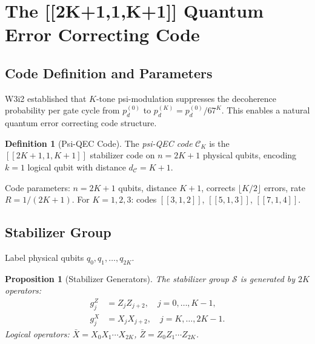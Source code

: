 \documentclass[11pt]{article}
\newtheorem{proposition}[theorem]{Proposition}
\theoremstyle{definition}
\newtheorem{definition}[theorem]{Definition}
\theoremstyle{remark}
\begin{document}
\section{The [[2K+1,1,K+1]] Quantum Error Correcting Code}
\label{sec:qec-code}

\subsection{Code Definition and Parameters}

W3i2 established that $K$-tone psi-modulation suppresses the decoherence
probability per gate cycle from $p_d^{(0)}$ to $p_d^{(K)} = p_d^{(0)}/67^K$.
This enables a natural quantum error correcting code structure.

\begin{definition}[Psi-QEC Code]
The \emph{psi-QEC code} $\mathcal{C}_{K}$ is the $[[2K+1,1,K+1]]$ stabilizer
code on $n = 2K+1$ physical qubits, encoding $k=1$ logical qubit with
distance $d_{\mathcal{C}} = K+1$.
\end{definition}

Code parameters: $n = 2K+1$ qubits, distance $K+1$, corrects
$\lfloor K/2\rfloor$ errors, rate $R = 1/(2K+1)$.
For $K=1,2,3$: codes $[[3,1,2]]$, $[[5,1,3]]$, $[[7,1,4]]$.

\subsection{Stabilizer Group}

Label physical qubits $q_0, q_1, \ldots, q_{2K}$.

\begin{proposition}[Stabilizer Generators]
The stabilizer group $\mathcal{S}$ is generated by $2K$ operators:
\begin{align}
  g_j^Z &= Z_j Z_{j+2}, \quad j = 0, \ldots, K-1, \label{eq:Zstab}\\
  g_j^X &= X_j X_{j+2}, \quad j = K, \ldots, 2K-1. \label{eq:Xstab}
\end{align}
Logical operators: $\bar{X} = X_0 X_1\cdots X_{2K}$,
$\bar{Z} = Z_0 Z_1\cdots Z_{2K}$.
\end{proposition}
\end{document}
